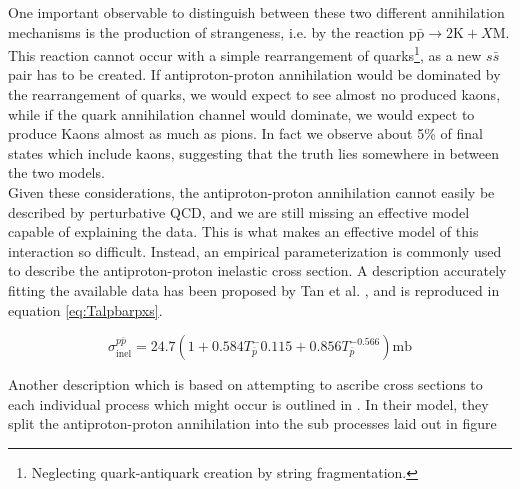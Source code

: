 One important observable to distinguish between these two different annihilation mechanisms is the production of strangeness, i.e. by the reaction $\mathrm{p\bar{p}} \rightarrow 2\mathrm{K}+ X\mathrm{M}$. This reaction cannot occur with a simple rearrangement of quarks\footnote{Neglecting quark-antiquark creation by string fragmentation.}, as a new $s\bar{s}$ pair has to be created. If antiproton-proton annihilation would be dominated by the rearrangement of quarks, we would expect to see almost no produced kaons, while if the quark annihilation channel would dominate, we would expect to produce Kaons almost as much as pions. In fact we observe about 5\% of final states which include kaons\cite{antiproton_cross_sections_review, hidden_Strangeness}, suggesting that the truth lies somewhere in between the two models. \\

Given these considerations, the antiproton-proton annihilation cannot easily be described by perturbative QCD, and we are still missing an effective model capable of explaining the data. This is what makes an effective model of this interaction so difficult. Instead, an empirical parameterization is commonly used to describe the antiproton-proton inelastic cross section. A description accurately fitting the available data has been proposed by Tan et al. \cite{Tan_1983}, and is reproduced in equation \ref{eq:Talpbarpxs}. 

\begin{equation}\label{eq:Talpbarpxs}
    \sigma_\mathrm{inel}^{p\bar{p}} = 24.7 (1 + 0.584T_{\bar{p}}^-0.115 + 0.856 T_{\bar{p}}^{-0.566}) \mathrm{mb}
\end{equation}

Another description which is based on attempting to ascribe cross sections to each individual process which might occur is outlined in \cite{antiproton_dynamics_CERN}. In their model, they split the antiproton-proton annihilation into the sub processes laid out in figure 


